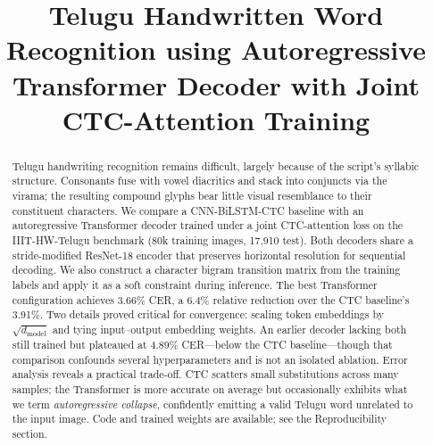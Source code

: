 \documentclass[conference]{IEEEtran}
\begin{document}
\sloppy

\title{Telugu Handwritten Word Recognition using Autoregressive Transformer Decoder with Joint CTC-Attention Training}

\author{
}

\maketitle

\begin{abstract}
Telugu handwriting recognition remains difficult, largely because of the script's syllabic structure. Consonants fuse with vowel diacritics and stack into conjuncts via the virama; the resulting compound glyphs bear little visual resemblance to their constituent characters. We compare a CNN-BiLSTM-CTC baseline with an autoregressive Transformer decoder trained under a joint CTC-attention loss on the IIIT-HW-Telugu benchmark (80k training images, 17,910 test). Both decoders share a stride-modified ResNet-18 encoder that preserves horizontal resolution for sequential decoding. We also construct a character bigram transition matrix from the training labels and apply it as a soft constraint during inference. The best Transformer configuration achieves 3.66\% CER, a 6.4\% relative reduction over the CTC baseline's 3.91\%. Two details proved critical for convergence: scaling token embeddings by $\sqrt{d_{\text{model}}}$ and tying input--output embedding weights. An earlier decoder lacking both still trained but plateaued at 4.89\% CER---below the CTC baseline---though that comparison confounds several hyperparameters and is not an isolated ablation. Error analysis reveals a practical trade-off. CTC scatters small substitutions across many samples; the Transformer is more accurate on average but occasionally exhibits what we term \textit{autoregressive collapse}, confidently emitting a valid Telugu word unrelated to the input image. Code and trained weights are available; see the Reproducibility section.
\end{abstract}
\end{document}
